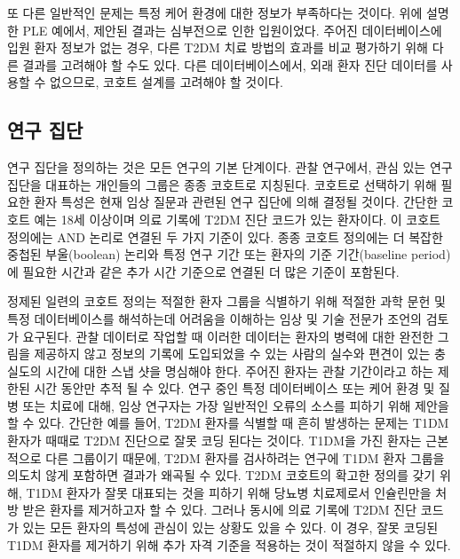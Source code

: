 \documentclass[11pt]{book}
\theoremstyle{definition}
\theoremstyle{definition}
\theoremstyle{definition}
\theoremstyle{remark}
\begin{document}
또 다른 일반적인 문제는 특정 케어 환경에 대한 정보가 부족하다는 것이다.
위에 설명한 PLE 예에서, 제안된 결과는 심부전으로 인한 입원이었다. 주어진
데이터베이스에 입원 환자 정보가 없는 경우, 다른 T2DM 치료 방법의 효과를
비교 평가하기 위해 다른 결과를 고려해야 할 수도 있다. 다른
데이터베이스에서, 외래 환자 진단 데이터를 사용할 수 없으므로, 코호트
설계를 고려해야 할 것이다.

\subsection{연구 집단}\label{-}

연구 집단을 정의하는 것은 모든 연구의 기본 단계이다. 관찰 연구에서, 관심
있는 연구 집단을 대표하는 개인들의 그룹은 종종 코호트로 지칭된다.
코호트로 선택하기 위해 필요한 환자 특성은 현재 임상 질문과 관련된 연구
집단에 의해 결정될 것이다. 간단한 코호트 예는 18세 이상이며 의료 기록에
T2DM 진단 코드가 있는 환자이다. 이 코호트 정의에는 AND 논리로 연결된 두
가지 기준이 있다. 종종 코호트 정의에는 더 복잡한 중첩된 부울(boolean)
논리와 특정 연구 기간 또는 환자의 기준 기간(baseline period)에 필요한
시간과 같은 추가 시간 기준으로 연결된 더 많은 기준이 포함된다.

정제된 일련의 코호트 정의는 적절한 환자 그룹을 식별하기 위해 적절한 과학
문헌 및 특정 데이터베이스를 해석하는데 어려움을 이해하는 임상 및 기술
전문가 조언의 검토가 요구된다. 관찰 데이터로 작업할 때 이러한 데이터는
환자의 병력에 대한 완전한 그림을 제공하지 않고 정보의 기록에 도입되었을
수 있는 사람의 실수와 편견이 있는 충실도의 시간에 대한 스냅 샷을
명심해야 한다. 주어진 환자는 관찰 기간이라고 하는 제한된 시간 동안만
추적 될 수 있다. 연구 중인 특정 데이터베이스 또는 케어 환경 및 질병 또는
치료에 대해, 임상 연구자는 가장 일반적인 오류의 소스를 피하기 위해
제안을 할 수 있다. 간단한 예를 들어, T2DM 환자를 식별할 때 흔히 발생하는
문제는 T1DM 환자가 때때로 T2DM 진단으로 잘못 코딩 된다는 것이다. T1DM을
가진 환자는 근본적으로 다른 그룹이기 때문에, T2DM 환자를 검사하려는
연구에 T1DM 환자 그룹을 의도치 않게 포함하면 결과가 왜곡될 수 있다. T2DM
코호트의 확고한 정의를 갖기 위해, T1DM 환자가 잘못 대표되는 것을 피하기
위해 당뇨병 치료제로서 인슐린만을 처방 받은 환자를 제거하고자 할 수
있다. 그러나 동시에 의료 기록에 T2DM 진단 코드가 있는 모든 환자의 특성에
관심이 있는 상황도 있을 수 있다. 이 경우, 잘못 코딩된 T1DM 환자를
제거하기 위해 추가 자격 기준을 적용하는 것이 적절하지 않을 수 있다.
\end{document}
